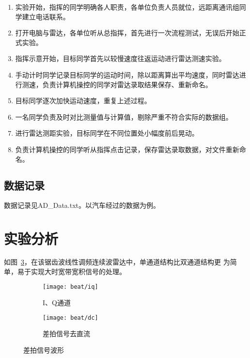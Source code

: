 \documentclass[../main]{subfiles}
\begin{document}
\begin{enumerate}
  \item 实验开始，指挥的同学明确各人职责，各单位负责人员就位，远距离通讯组同
    学建立电话联系。
  \item 打开电脑与雷达，各单位听从总指挥，首先进行一次流程测试，无误后开始正
    式实验。
  \item 指挥示意开始，目标同学首先以较慢速度往返运动进行雷达测速实验。
  \item 手动计时同学记录目标同学的运动时间，除以距离算出平均速度，同时雷达进
    行测速，负责计算机操控的同学对雷达录取结果保存、重新命名。
  \item 目标同学逐次加快运动速度，重复上述过程。
  \item 一名同学负责及时对比测量值与计算值，剔除严重不符合实际的数据组。
  \item 进行雷达测距实验，目标同学在不同位置处小幅度前后晃动。
  \item 负责计算机操控的同学听从指挥点击记录，保存雷达录取数据，对文件重新命
    名。
\end{enumerate}

\subsection{数据记录}%
\label{sub:\arabic{chapter}record}

数据记录见AD\_Data.txt。以汽车经过的数据为例。

\section{实验分析}%
\label{sec:\arabic{chapter}analysis}

如图~\ref{fig:beat}，在该锯齿波线性调频连续波雷达中，单通道结构比双通道结构更
为简单，易于实现大时宽带宽积信号的处理。

\begin{figure}[htbp]
  \centering
  \begin{subfigure}[htbp]{0.45\linewidth}
    \centering
    \texttt{[image: beat/iq]}
    \caption{I、Q通道}%
    \label{fig:beat/iq}
  \end{subfigure}
  \quad
  \begin{subfigure}[htbp]{0.45\linewidth}
    \centering
    \texttt{[image: beat/dc]}
    \caption{差拍信号去直流}%
    \label{fig:beat/dc}
  \end{subfigure}
  \caption{差拍信号波形}%
  \label{fig:beat}
\end{figure}
\end{document}
